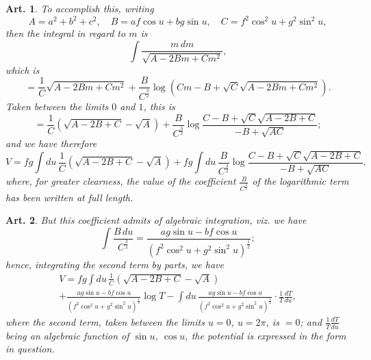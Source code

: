 \documentclass[12pt,a4paper]{article}
\theoremstyle{cayley}
\newtheorem{art}{Art.}[section]
\begin{document}
\begin{art}
To accomplish this, writing
\[ A = a^2 + b^2 + c^2, \quad B = af\cos u + bg\sin u, \quad C = f^2\cos^2 u + g^2\sin^2 u, \]
then the integral in regard to $m$ is
\[
\int \frac{m\,dm}{\sqrt{A - 2Bm + Cm^2}},
\]
which is
\[
= \frac{1}{C}\sqrt{A - 2Bm + Cm^2} + \frac{B}{C^{\frac{3}{2}}}\log(Cm - B + \sqrt{C}\sqrt{A - 2Bm + Cm^2}).
\]
Taken between the limits $0$ and $1$, this is
\[
= \frac{1}{C}(\sqrt{A - 2B + C} - \sqrt{A}) + \frac{B}{C^{\frac{3}{2}}}\log\frac{C - B + \sqrt{C}\sqrt{A - 2B + C}}{-B + \sqrt{AC}};
\]
and we have therefore
\[
V = fg\int du\, \frac{1}{C}(\sqrt{A - 2B + C} - \sqrt{A}) + fg\int du\, \frac{B}{C^{\frac{3}{2}}}\log\frac{C - B + \sqrt{C}\sqrt{A - 2B + C}}{-B + \sqrt{AC}},
\]
where, for greater clearness, the value of the coefficient $\frac{B}{C^{\frac{3}{2}}}$ of the logarithmic term has been written at full length.
\end{art}

\begin{art}
But this coefficient admits of algebraic integration, viz. we have
\[
\int \frac{B\,du}{C^{\frac{3}{2}}}
= \frac{ag\sin u - bf\cos u}{(f^2\cos^2 u + g^2\sin^2 u)^{\frac{1}{2}}};
\]
hence, integrating the second term by parts, we have
\begin{multline*}
V = fg\int du\, \frac{1}{C}(\sqrt{A - 2B + C} - \sqrt{A}) \\
+ \frac{ag\sin u - bf\cos u}{(f^2\cos^2 u + g^2\sin^2 u)^{\frac{1}{2}}}\log T
- \int du\, \frac{ag\sin u - bf\cos u}{(f^2\cos^2 u + g^2\sin^2 u)^{\frac{1}{2}}} \cdot \frac{1}{T}\frac{dT}{du},
\end{multline*}
where the second term, taken between the limits $u=0$, $u=2\pi$, is $=0$; and $\frac{1}{T}\frac{dT}{du}$ being an algebraic function of $\sin u$, $\cos u$, the potential is expressed in the form in question.
\end{art}
\end{document}
